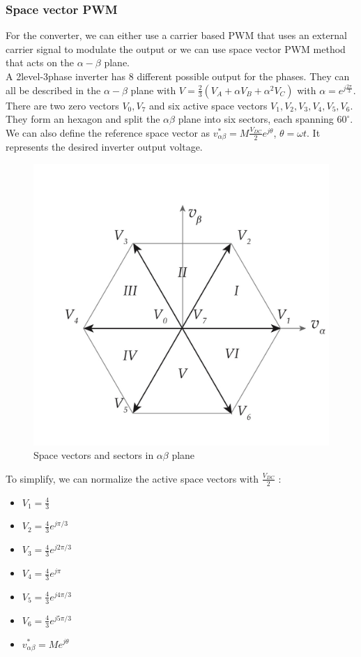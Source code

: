 \documentclass[../main.tex]{subfiles}
\begin{document}
\subsubsection{Space vector PWM}
For the converter, we can either use a carrier based PWM that uses an external carrier signal to modulate the output or we can use space vector PWM method that acts on the $\alpha-\beta$ plane.\\

A 2level-3phase inverter has 8 different possible output for the phases. They can all be described in the $\alpha-\beta$ plane with $V = \frac{2}{3} (V_A + \alpha V_B + \alpha^2 V_C)$ with $\alpha = e^{j\frac{2\pi}{3}}$.\\
There are two zero vectors $V_0, V_7$ and six active space vectors $V_1, V_2, V_3, V_4, V_5, V_6$.\\

They form an hexagon and split the $\alpha \beta$ plane into six sectors, each spanning $60^\circ$.\\
We can also define the reference space vector as $v_{\alpha \beta}^* = M \frac{V_{DC}}{2}e^{j\theta}$, $\theta = \omega t$. It represents the desired inverter output voltage.\\

\begin{figure}[hbt!]
    \centering
    \includegraphics[width=0.6\linewidth]{IMAGES/Indus_el/IMG_0189.jpeg}
    \caption{Space vectors and sectors in $\alpha\beta$ plane}
\end{figure}

To simplify, we can normalize the active space vectors with $\frac{V_{DC}}{2}$ : \begin{itemize}
    \item $V_1 = \frac{4}{3}$
    \item $V_2 = \frac{4}{3} e^{j\pi/3}$
    \item $V_3 = \frac{4}{3} e^{j 2\pi/3}$
    \item $V_4 = \frac{4}{3} e^{j \pi}$
    \item $V_5 = \frac{4}{3} e^{j 4\pi/3}$
    \item $V_6 = \frac{4}{3} e^{j5 \pi/3}$
    \item $v_{\alpha \beta}^* = Me^{j\theta}$
\end{itemize}
\end{document}
